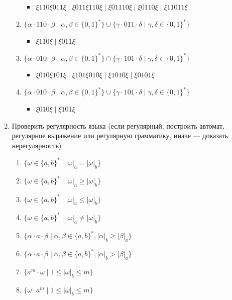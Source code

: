 \documentclass[12pt]{article}
\begin{document}
\begin{enumerate}
\begin{enumerate}[label=\arabic*)]
    \begin{itemize}
      \item $\xi 110 \xi 011 \xi \mid \xi 011 \xi 110 \xi \mid \xi 01110 \xi \mid \xi 0110 \xi \mid \xi 11011 \xi$
    \end{itemize}
    \item $\{ \alpha \cdot 110 \cdot \beta \mid \alpha, \beta \in \{0, 1\}^*\} \cup \{\gamma \cdot 011 \cdot \delta \mid \gamma, \delta \in \{0, 1\}^* \}$
    \begin{itemize}
      \item $\xi 110 \xi \mid \xi 011 \xi $
    \end{itemize}
    \item $\{ \alpha \cdot 010 \cdot \beta \mid \alpha, \beta \in \{0, 1\}^*\} \cap \{\gamma \cdot 101 \cdot \delta \mid \gamma, \delta \in \{0, 1\}^* \}$
    \begin{itemize}
      \item $\xi 010 \xi 101 \xi \mid \xi 101 \xi 010 \xi \mid \xi 1010 \xi \mid \xi 0101 \xi$
    \end{itemize}
    \item $\{ \alpha \cdot 010 \cdot \beta \mid \alpha, \beta \in \{0, 1\}^*\} \cup \{\gamma \cdot 101 \cdot \delta \mid \gamma, \delta \in \{0, 1\}^* \}$
    \begin{itemize}
      \item $\xi 010 \xi \mid \xi 101 \xi $
    \end{itemize}
  \end{enumerate}

  \item Проверить регулярность языка (если регулярный, построить автомат, регулярное выражение или регулярную грамматику, иначе --- доказать нерегулярность)
  \begin{enumerate}[label=\arabic*)]
    \setlength\itemsep{0.8em}

    \item $\{\omega \in \{a, b\}^* \mid |\omega|_a = |\omega|_b\}$
    \item $\{\omega \in \{a, b\}^* \mid |\omega|_a \geq |\omega|_b\}$
    \item $\{\omega \in \{a, b\}^* \mid |\omega|_a \leq |\omega|_b\}$
    \item $\{\omega \in \{a, b\}^* \mid |\omega|_a \neq |\omega|_b\}$
    \item $\{\alpha \cdot a \cdot \beta \mid \alpha, \beta \in \{a, b\}^*, |\alpha|_b \geq |\beta|_a \}$
    \item $\{\alpha \cdot a \cdot \beta \mid \alpha, \beta \in \{a, b\}^*, |\alpha|_b > |\beta|_a \}$
    \item $\{a^m \cdot \omega \mid 1 \leq |\omega|_b \leq m\}$
    \item $\{\omega \cdot a^m  \mid 1 \leq |\omega|_b \leq m\}$
  \end{enumerate}


\end{enumerate}
\end{document}
